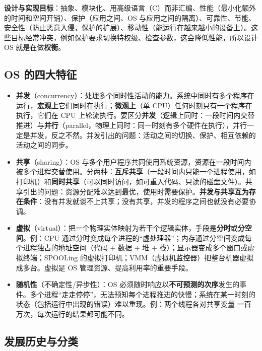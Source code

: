 \textbf{设计与实现目标}：抽象、模块化、用高级语言（C）而非汇编、性能（最小化额外的时间和空间开销）、保护（应用之间、OS 与应用之间的隔离）、可靠性、节能、安全性（防止恶意入侵，保护的扩展）、移动性（能运行在越来越小的设备上）。这些目标经常冲突，例如保护要求切换特权级、检查参数，这会降低性能，所以设计 OS 就是在做\textbf{权衡}。

\subsection{OS 的四大特征}

\begin{itemize}
    \item \textbf{并发}（concurrency）：处理多个同时性活动的能力。系统中同时有多个程序在运行，\textbf{宏观上}它们同时在执行；\textbf{微观上}（单 CPU）任何时刻只有一个程序在执行，它们在 CPU 上轮流执行。要区分\textbf{并发}（逻辑上同时：一段时间内交替推进）与\textbf{并行}（parallel，物理上同时：同一时刻有多个硬件在执行），并行一定是并发，反之不然。并发引出的问题：活动之间的切换、保护、相互依赖的活动之间的同步。
    \item \textbf{共享}（sharing）：OS 与多个用户程序共同使用系统资源，资源在一段时间内被多个进程交替使用。分两种：\textbf{互斥共享}（一段时间内只能一个进程使用，如打印机）和\textbf{同时共享}（可以同时访问，如可重入代码、只读的磁盘文件）。共享引出的问题：资源分配难以达到最优，使用时需要保护。\textbf{并发与共享互为存在条件}：没有并发就谈不上共享；没有共享，并发的程序之间也就没有必要协调。
    \item \textbf{虚拟}（virtual）：把一个物理实体映射为若干个逻辑实体，手段是\textbf{分时}或\textbf{分空间}。例：CPU 通过分时变成每个进程的“虚处理器”；内存通过分空间变成每个进程独占的地址空间（代码 + 数据 + 堆 + 栈）；显示器变成多个窗口或虚拟终端；SPOOLing 的虚拟打印机；VMM（虚拟机监控器）把整台机器虚拟成多台。虚拟是 OS 管理资源、提高利用率的重要手段。
    \item \textbf{随机性}（不确定性/异步性）：OS 必须随时响应以\textbf{不可预测的次序}发生的事件。多个进程“走走停停”，无法预知每个进程推进的快慢；系统在某一时刻的状态（包括运行中出现的错误）难以重现。例：两个线程各对共享变量  一百万次，每次运行的结果都可能不同。
\end{itemize}

\subsection{发展历史与分类}

